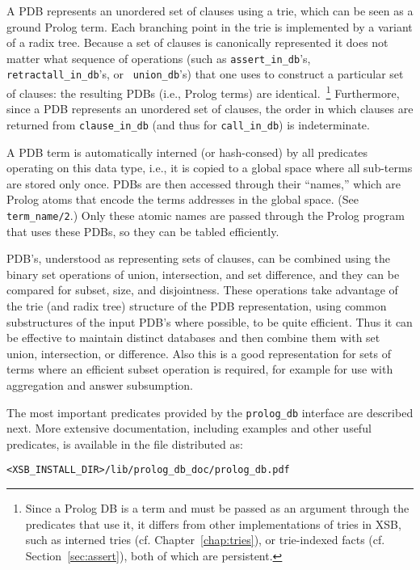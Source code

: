 A PDB represents an unordered set of clauses using a trie, which can
be seen as a ground Prolog term.  Each branching point in the trie is
implemented by a variant of a radix tree.  Because a set of clauses is
canonically represented it does not matter what sequence of operations
(such as {\tt assert\_in\_db}'s, {\tt retractall\_in\_db}'s, or {\tt
  union\_db}'s) that one uses to construct a particular set of
clauses: the resulting PDBs (i.e., Prolog terms) are
identical.~\footnote{Since a Prolog DB is a term and must be passed as
  an argument through the predicates that use it, it differs from
  other implementations of tries in XSB, such as interned tries
  (cf. Chapter~\ref{chap:tries}), or trie-indexed facts
  (cf. Section~\ref{sec:assert}), both of which are persistent.}
Furthermore, since a PDB represents an unordered set of clauses, the
order in which clauses are returned from {\tt clause\_in\_db} (and
thus for {\tt call\_in\_db}) is indeterminate.


A PDB term is automatically interned (or hash-consed) by all
predicates operating on this data type, i.e., it is copied to a global
space where all sub-terms are stored only once.  PDBs are then
accessed through their ``names,'' which are Prolog atoms that encode
the terms addresses in the global space.  (See {\tt term\_name/2}.)
Only these atomic names are passed through the Prolog program that
uses these PDBs, so they can be tabled efficiently.

PDB's, understood as representing sets of clauses, can be combined
using the binary set operations of union, intersection, and set
difference, and they can be compared for subset, size, and
disjointness.  These operations take advantage of the trie (and radix
tree) structure of the PDB representation, using common substructures
of the input PDB's where possible, to be quite efficient.  Thus it can
be effective to maintain distinct databases and then combine them with
set union, intersection, or difference.  Also this is a good
representation for sets of terms where an efficient subset operation is
required, for example for use with aggregation and answer subsumption.

The most important predicates provided by the {\tt prolog\_db}
interface are described next.  More extensive documentation, including
examples and other useful predicates, is available in the file
distributed as:

{\tt <XSB\_INSTALL\_DIR>/lib/prolog\_db\_doc/prolog\_db.pdf}

